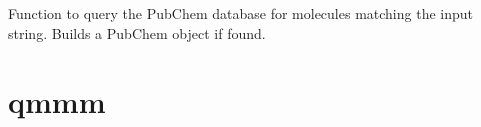 \documentclass[letterpaper,10pt,english]{sphinxmanual}
\begin{document}

\begin{fulllineitems}
\label{index:pubchem.getPubChemResults}
Function to query the PubChem database for molecules matching the
input string. Builds a PubChem object if found.

\end{fulllineitems}



\section{qmmm}
\label{index:qmmm}\label{index:module-qmmm}

\begin{fulllineitems}
\label{index:qmmm.Diffuse}~

\begin{fulllineitems}
\label{index:qmmm.Diffuse.fitGeneral}
\end{fulllineitems}


\begin{fulllineitems}
\label{index:qmmm.Diffuse.fitScf}
\end{fulllineitems}


\begin{fulllineitems}
\label{index:qmmm.Diffuse.populateExtern}
\end{fulllineitems}


\end{fulllineitems}

\end{document}
